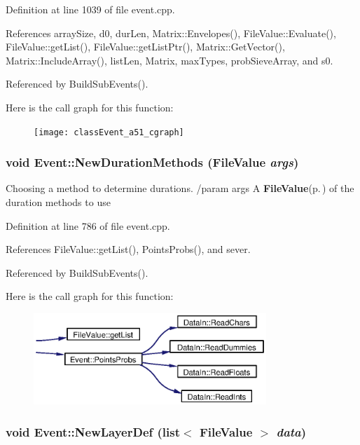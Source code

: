 Definition at line 1039 of file event.cpp.

References array\-Size, d0, dur\-Len, Matrix::Envelopes(), File\-Value::Evaluate(), File\-Value::get\-List(), File\-Value::get\-List\-Ptr(), Matrix::Get\-Vector(), Matrix::Include\-Array(), list\-Len, Matrix, max\-Types, prob\-Sieve\-Array, and s0.

Referenced by Build\-Sub\-Events().

Here is the call graph for this function:\begin{figure}[H]
\begin{center}
\leavevmode
\texttt{[image: classEvent\_a51\_cgraph]}
\end{center}
\end{figure}
\subsubsection{\setlength{\rightskip}{0pt plus 5cm}void Event::New\-Duration\-Methods ({\bf File\-Value} {\em args})}\label{classEvent_a36}


Choosing a method to determine durations. /param args A {\bf File\-Value}{\rm (p.\,\pageref{classFileValue})} of the duration methods to use 

Definition at line 786 of file event.cpp.

References File\-Value::get\-List(), Points\-Probs(), and sever.

Referenced by Build\-Sub\-Events().

Here is the call graph for this function:\begin{figure}[H]
\begin{center}
\leavevmode
\includegraphics[width=249pt]{classEvent_a36_cgraph}
\end{center}
\end{figure}
\subsubsection{\setlength{\rightskip}{0pt plus 5cm}void Event::New\-Layer\-Def (list$<$ {\bf File\-Value} $>$ {\em data})}\label{classEvent_a25}


